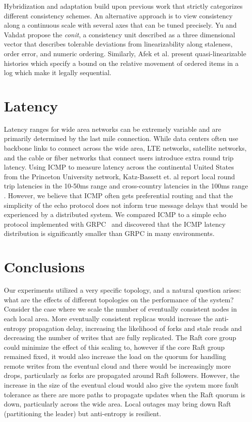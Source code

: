 \documentclass[10pt,conference,letterpaper]{IEEEtran}
\begin{document}
Hybridization and adaptation build upon previous work that strictly categorizes different consistency schemes. An alternative approach is to view consistency along a continuous scale with several axes that can be tuned precisely. Yu and Vahdat \cite{yu_design_2002} propose the \textit{conit}, a consistency unit described as a three dimensional vector that describes tolerable deviations from linearizability along staleness, order error, and numeric ordering. Similarly, Afek et al. \cite{afek_quasi-linearizability:_2010} present quasi-linearizable histories which specify a bound on the relative movement of ordered items in a log which make it legally sequential.

\section{Latency}

Latency ranges for wide area networks can be extremely variable and are primarily
determined by the last mile connection.
While data centers often use backbone links to connect across the wide area, LTE networks,
satellite networks, and the cable or fiber networks that connect users introduce extra
round trip latency.
Using ICMP to measure latency across the continental United States from the Princeton
University network, Katz-Bassett et.
al report local round trip latencies in the 10-50ms range and cross-country latencies in
the 100ms range \cite{katz-bassett_towards_2006}.
However, we believe that ICMP often gets preferential routing and that the simplicity of
the echo protocol does not inform true message delays that would be experienced by a
distributed system.
We compared ICMP to a simple echo protocol implemented with GRPC~\cite{grpc} and discovered that the
ICMP latency distribution is significantly smaller than GRPC in many environments.

\section{Conclusions}

Our experiments utilized a very specific topology, and a natural question arises: what are the effects of different topologies on the performance of the system? Consider the case where we scale the number of eventually consistent nodes in each local area. More eventually consistent replicas would increase the anti-entropy propagation delay, increasing the likelihood of forks and stale reads and decreasing the number of writes that are fully replicated. The Raft core group could minimize the effect of this scaling to, however if the core Raft group remained fixed, it would also increase the load on the quorum for handling remote writes from the eventual cloud and there would be increasingly more drops, particularly as forks are propagated around Raft followers. However, the increase in the size of the eventual cloud would also give the system more fault tolerance as there are more paths to propagate updates when the Raft quorum is down, particularly across the wide area. Local outages may bring down Raft (partitioning the leader) but anti-entropy is resilient.
\end{document}

